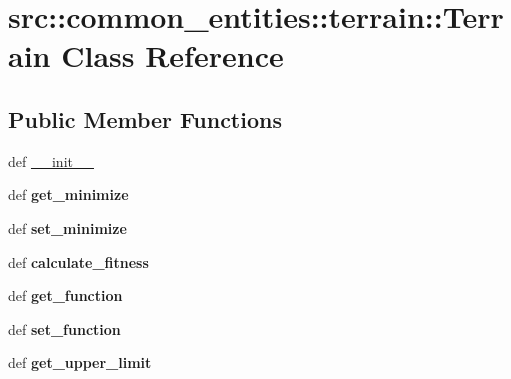 \hypertarget{classsrc_1_1common__entities_1_1terrain_1_1Terrain}{
\section{src::common\_\-entities::terrain::Terrain Class Reference}
\label{classsrc_1_1common__entities_1_1terrain_1_1Terrain}
}
\subsection*{Public Member Functions}
\begin{DoxyCompactItemize}
\item 
def \hyperlink{classsrc_1_1common__entities_1_1terrain_1_1Terrain_a65ef1024c77b1bb8e3f5d164a3cb7233}{\_\-\_\-init\_\-\_\-}
\item 
\hypertarget{classsrc_1_1common__entities_1_1terrain_1_1Terrain_aef08aab0c1981b506fdbdb621faedf31}{
def {\bfseries get\_\-minimize}}
\label{classsrc_1_1common__entities_1_1terrain_1_1Terrain_aef08aab0c1981b506fdbdb621faedf31}

\item 
\hypertarget{classsrc_1_1common__entities_1_1terrain_1_1Terrain_ac83738d3f101348823db3e8110563afa}{
def {\bfseries set\_\-minimize}}
\label{classsrc_1_1common__entities_1_1terrain_1_1Terrain_ac83738d3f101348823db3e8110563afa}

\item 
\hypertarget{classsrc_1_1common__entities_1_1terrain_1_1Terrain_a5afd912496748cd00d790ef577cc6f56}{
def {\bfseries calculate\_\-fitness}}
\label{classsrc_1_1common__entities_1_1terrain_1_1Terrain_a5afd912496748cd00d790ef577cc6f56}

\item 
\hypertarget{classsrc_1_1common__entities_1_1terrain_1_1Terrain_aaa9fc499fcdafd8ffc0ef10b388adb73}{
def {\bfseries get\_\-function}}
\label{classsrc_1_1common__entities_1_1terrain_1_1Terrain_aaa9fc499fcdafd8ffc0ef10b388adb73}

\item 
\hypertarget{classsrc_1_1common__entities_1_1terrain_1_1Terrain_a9c6b34375935a498ebbe04ef90f9e25c}{
def {\bfseries set\_\-function}}
\label{classsrc_1_1common__entities_1_1terrain_1_1Terrain_a9c6b34375935a498ebbe04ef90f9e25c}

\item 
\hypertarget{classsrc_1_1common__entities_1_1terrain_1_1Terrain_a942087e4e6930b189172172790a2d2af}{
def {\bfseries get\_\-upper\_\-limit}}
\label{classsrc_1_1common__entities_1_1terrain_1_1Terrain_a942087e4e6930b189172172790a2d2af}


\end{DoxyCompactItemize}
